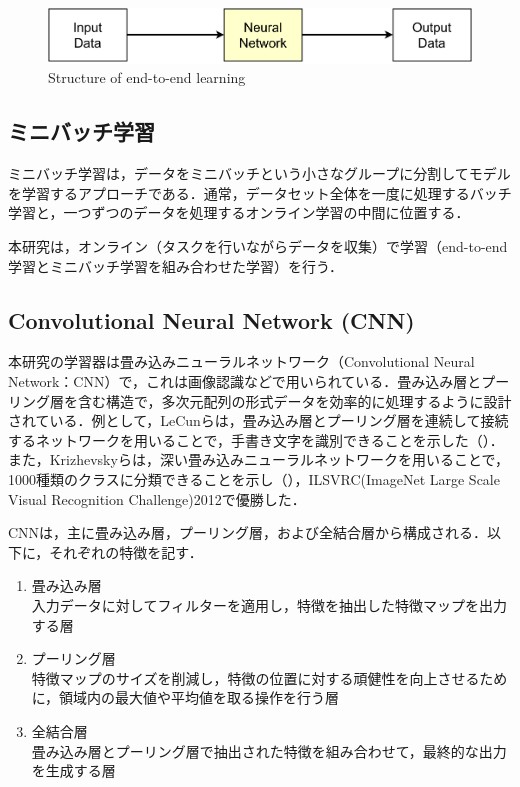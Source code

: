   \begin{figure}[h]
    \centering
    \includegraphics[keepaspectratio, scale=0.80] {images/pdf/RobotGuidance_about_end-to-end}
    \caption{Structure of end-to-end learning}
    \label{Fig:about_end-to-end}
  \end{figure}

\subsection{ミニバッチ学習}

  ミニバッチ学習は，データをミニバッチという小さなグループに分割してモデルを学習するアプローチである．通常，データセット全体を一度に処理するバッチ学習と，一つずつのデータを処理するオンライン学習の中間に位置する．

  \vspace{2cm}

  本研究は，オンライン（タスクを行いながらデータを収集）で学習（end-to-end学習とミニバッチ学習を組み合わせた学習）を行う．

\newpage

\subsection{Convolutional Neural Network (CNN)}

  本研究の学習器は畳み込みニューラルネットワーク（Convolutional Neural Network：CNN）で，これは画像認識などで用いられている\cite{yann1}\cite{alex}．畳み込み層とプーリング層を含む構造で，多次元配列の形式データを効率的に処理するように設計されている．例として，LeCunら\cite{yann1}は，畳み込み層とプーリング層を連続して接続するネットワークを用いることで，手書き文字を識別できることを示した（）．また，Krizhevskyら\cite{alex}は，深い畳み込みニューラルネットワークを用いることで，1000種類のクラスに分類できることを示し（），ILSVRC(ImageNet Large Scale Visual Recognition Challenge)2012で優勝した．

  CNNは，主に畳み込み層，プーリング層，および全結合層から構成される．以下に，それぞれの特徴を記す．

  \begin{enumerate}
    \item 畳み込み層\\
    入力データに対してフィルターを適用し，特徴を抽出した特徴マップを出力する層
    \item プーリング層\\
    特徴マップのサイズを削減し，特徴の位置に対する頑健性を向上させるために，領域内の最大値や平均値を取る操作を行う層
    \item 全結合層\\
    畳み込み層とプーリング層で抽出された特徴を組み合わせて，最終的な出力を生成する層
  \end{enumerate}

